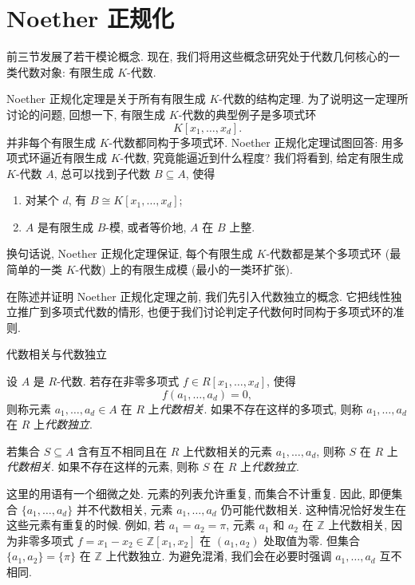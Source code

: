 \section{Noether 正规化}\label{sec:noether-normalization}

前三节发展了若干模论概念. 现在, 我们将用这些概念研究处于代数几何核心的一类代数对象: 有限生成 $K$-代数.

Noether 正规化定理是关于所有有限生成 $K$-代数的结构定理. 为了说明这一定理所讨论的问题, 回想一下, 有限生成 $K$-代数的典型例子是多项式环
\[
  K[x_{1},\ldots,x_{d}].
\]
并非每个有限生成 $K$-代数都同构于多项式环. Noether 正规化定理试图回答: 用多项式环\textquotedbl{}逼近\textquotedbl{}有限生成 $K$-代数, 究竟能逼近到什么程度? 我们将看到, 给定有限生成 $K$-代数 $A$, 总可以找到子代数 $B\subseteq A$, 使得
\begin{enumerate}
  \item 对某个 $d$, 有 $B\cong K[x_{1},\ldots,x_{d}]$;
  \item $A$ 是有限生成 $B$-模, 或者等价地, $A$ 在 $B$ 上整.
\end{enumerate}
换句话说, Noether 正规化定理保证, 每个有限生成 $K$-代数都是某个多项式环 (最简单的一类 $K$-代数) 上的有限生成模 (最小的一类环扩张).

在陈述并证明 Noether 正规化定理之前, 我们先引入代数独立的概念. 它把线性独立推广到多项式代数的情形, 也便于我们讨论判定子代数何时同构于多项式环的准则.

\begin{Definition}{代数相关与代数独立}\leavevmode\label{def:algebraic-dependence-and-independence}\strut\par\nopagebreak[4]\noindent
设 $A$ 是 $R$-代数. 若存在非零多项式 $f\in R[x_{1},\ldots,x_{d}]$, 使得
\[
  f(a_{1},\ldots,a_{d})=0,
\]
则称元素 $a_{1},\ldots,a_{d}\in A$ 在 $R$ 上\emph{代数相关}. 如果不存在这样的多项式, 则称 $a_{1},\ldots,a_{d}$ 在 $R$ 上\emph{代数独立}.

若集合 $S\subseteq A$ 含有互不相同且在 $R$ 上代数相关的元素 $a_{1},\ldots,a_{d}$, 则称 $S$ 在 $R$ 上\emph{代数相关}. 如果不存在这样的元素, 则称 $S$ 在 $R$ 上\emph{代数独立}.
\end{Definition}

这里的用语有一个细微之处. 元素的列表允许重复, 而集合不计重复. 因此, 即便集合 $\{a_{1},\ldots,a_{d}\}$ 并不代数相关, 元素 $a_{1},\ldots,a_{d}$ 仍可能代数相关. 这种情况恰好发生在这些元素有重复的时候. 例如, 若 $a_{1}=a_{2}=\pi$, 元素 $a_{1}$ 和 $a_{2}$ 在 $\mathbb{Z}$ 上代数相关, 因为非零多项式 $f=x_{1}-x_{2}\in\mathbb{Z}[x_{1},x_{2}]$ 在 $(a_{1},a_{2})$ 处取值为零. 但集合 $\{a_{1},a_{2}\}=\{\pi\}$ 在 $\mathbb{Z}$ 上代数独立. 为避免混淆, 我们会在必要时强调 $a_{1},\ldots,a_{d}$ 互不相同.

